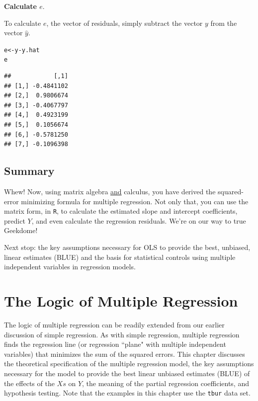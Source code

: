 \documentclass[11pt,openany]{book}\usepackage[]{graphicx}\usepackage[]{color}
\makeatletter
\newcommand{\hlopt}[1]{\textcolor[rgb]{0,0,0}{#1}}%
\newcommand{\hlstd}[1]{\textcolor[rgb]{0.345,0.345,0.345}{#1}}%
\newcommand{\hlkwb}[1]{\textcolor[rgb]{0.69,0.353,0.396}{#1}}%
\newenvironment{kframe}{%
 \def\at@end@of@kframe{}%
 \ifinner\ifhmode%
  \def\at@end@of@kframe{\end{minipage}}%
  \begin{minipage}{\columnwidth}%
 \fi\fi%
 \def\FrameCommand##1{\hskip\@totalleftmargin \hskip-\fboxsep
 \colorbox{shadecolor}{##1}\hskip-\fboxsep
     \hskip-\linewidth \hskip-\@totalleftmargin \hskip\columnwidth}%
 \MakeFramed {\advance\hsize-\width
   \@totalleftmargin\z@ \linewidth\hsize
   \@setminipage}}%
 {\par\unskip\endMakeFramed%
 \at@end@of@kframe}
\newenvironment{knitrout}{}{} %
\renewenvironment{knitrout}{\begin{singlespace}}{\end{singlespace}} %
\makeatother
\begin{document}
\noindent \textbf{Calculate $e$}. 

\noindent To calculate $e$, the vector of residuals, simply subtract the vector $y$ from the vector $\hat y$. 
\begin{knitrout}
\color{fgcolor}\begin{kframe}
\begin{alltt}
\hlstd{e} \hlkwb{<-} \hlstd{y} \hlopt{-} \hlstd{y.hat}
\hlstd{e}
\end{alltt}
\begin{verbatim}
##            [,1]
## [1,] -0.4841102
## [2,]  0.9806674
## [3,] -0.4067797
## [4,]  0.4923199
## [5,]  0.1056674
## [6,] -0.5781250
## [7,] -0.1096398
\end{verbatim}
\end{kframe}
\end{knitrout}

\section{Summary}

Whew! Now, using matrix algebra \underline{and} calculus, you have derived the squared-error minimizing formula for multiple regression. Not only that, you can use the matrix form, in \texttt{R}, to calculate the estimated slope and intercept coefficients, predict $Y$,  and even calculate the regression residuals. We're on our way to true Geekdome!

Next stop: the key assumptions necessary for OLS to provide the best, unbiased, linear estimates (BLUE) and the basis for statistical controls using multiple independent variables in regression models.




\chapter{The Logic of Multiple Regression} 

The logic of multiple regression can be readily extended from our earlier discussion of simple regression. As with simple regression, multiple regression finds the regression line (or regression ``plane" with multiple independent variables) that minimizes the sum of the squared errors. This chapter discusses the theoretical specification of the multiple regression model, the key assumptions necessary for the model to provide the best linear unbiased estimates (BLUE) of the effects of the $Xs$ on $Y$, the meaning of the partial regression coefficients, and hypothesis testing. Note that the examples in this chapter use the \texttt{tbur} data set. 
\end{document}
